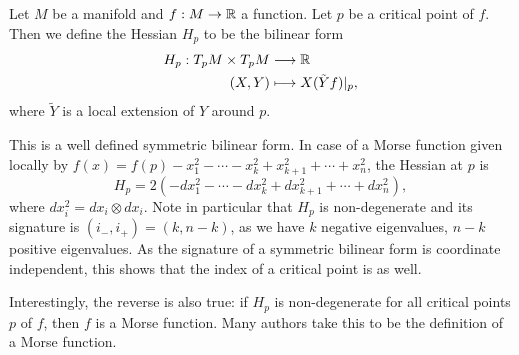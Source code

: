 \begin{definition}
    Let $M$ be a manifold and $f: M \to  \mathbb{R}$ a function.
    Let $p$ be a critical point of $f$.
    Then we define the Hessian $H_p$ to be the bilinear form
    \begin{align*}
        H_p: T_pM \times T_pM &\longrightarrow  \mathbb{R}\\
        (X, Y) &\longmapsto X (\tilde{Y} f)|_p
    ,\end{align*} 
    where $\tilde{Y}$ is a local extension of $Y$ around $p$.
\end{definition}
This is a well defined symmetric bilinear form.
In case of a Morse function given locally by $f(x) = f(p) - x_1^2 - \cdots - x_k^2 + x_{k+1}^2 + \cdots + x_n^2$, the Hessian at $p$ is 
\[
    H_p = 2(- dx_1^2 - \cdots - dx_k^2 + dx_{k+1}^2  + \cdots + dx_n^2)
,\] 
where $dx_i^2 = dx_i \otimes dx_i$.
Note in particular that $H_p$ is non-degenerate and its signature is $(i_-, i_{+}) = (k, n-k)$, as we have $k$ negative eigenvalues, $n-k$ positive eigenvalues.
As the signature of a symmetric bilinear form is coordinate independent, this shows that the index of a critical point is as well.


Interestingly, the reverse is also true: if $H_p$ is non-degenerate for all critical points  $p$ of $f$, then  $f$ is a Morse function.
Many authors take this to be the definition of a Morse function.

